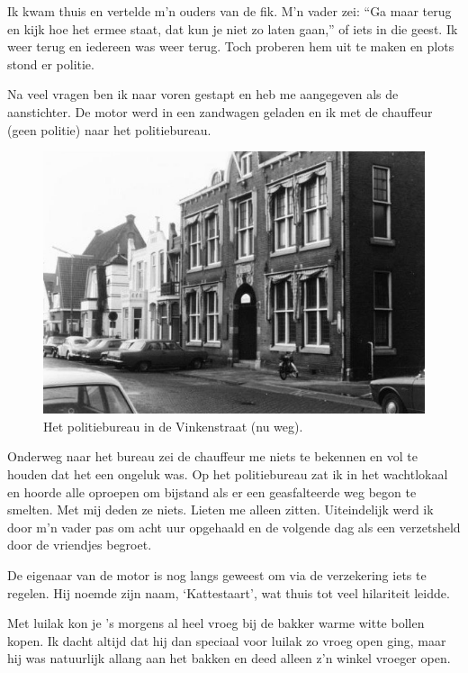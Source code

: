 \documentclass[10pt,twoside, openright]{memoir}
\begin{document}
Ik kwam thuis en vertelde m’n ouders van de fik. M’n vader zei: ``Ga maar terug en kijk hoe het ermee staat, dat kun je niet zo laten gaan,'' of iets in die geest. Ik weer terug en iedereen was weer terug. Toch proberen hem uit te maken en plots stond er politie. 

Na veel vragen ben ik naar voren gestapt en heb me aangegeven als de aanstichter. De motor werd in een zandwagen geladen en ik met de chauffeur (geen politie) naar het politiebureau. 

\begin{figure}
\includegraphics[width=\textwidth]{img/ch9/politburo}
\caption*{\footnotesize Het politiebureau in de Vinkenstraat (nu weg).}
\end{figure}

Onderweg naar het bureau zei de chauffeur me niets te bekennen en vol te houden dat het een ongeluk was. Op het politiebureau zat ik in het wachtlokaal en hoorde alle oproepen om bijstand als er een geasfalteerde weg begon te smelten. Met mij deden ze niets. Lieten me alleen zitten. Uiteindelijk werd ik door m’n vader pas om acht uur opgehaald en de volgende dag als een verzetsheld door de vriendjes begroet. 

De eigenaar van de motor is nog langs geweest om via de verzekering iets te regelen. Hij noemde zijn naam, `Kattestaart', wat thuis tot veel hilariteit leidde.

Met luilak kon je ’s morgens al heel vroeg bij de bakker warme witte bollen kopen. Ik dacht altijd dat hij dan speciaal voor luilak zo vroeg open ging, maar hij was natuurlijk allang aan het bakken en deed alleen z’n winkel vroeger open. 
\end{document}
